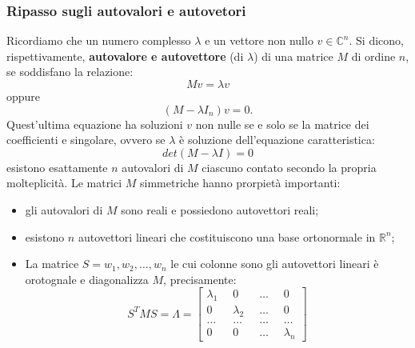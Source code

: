 \subsubsection{Ripasso sugli autovalori e autovetori}
Ricordiamo che un numero complesso $\lambda$ e un vettore non nullo $v \in \mathbb{C}^n$. Si dicono, rispettivamente, \textbf{autovalore e autovettore} (di $\lambda$) di una matrice $M$ di ordine $n$, se soddisfano la relazione:
\[
    Mv = \lambda v
\]
oppure
\[
    (M-\lambda I_n)v = 0.
\]
Quest'ultima equazione ha soluzioni $v$ non nulle se e solo se la matrice dei coefficienti e singolare, ovvero se $\lambda$ è soluzione dell'equazione caratteristica:
\[
    det(M-\lambda I) = 0
\]
esistono esattamente $n$ autovalori di $M$ ciascuno contato secondo la propria molteplicità.\newline
Le matrici $M$ simmetriche hanno prorpietà importanti:
\begin{itemize}
    \item gli autovalori di $M$ sono reali e possiedono autovettori reali;
    \item esistono $n$ autovettori lineari che costituiscono una base ortonormale in $\mathbb{R}^n$;
    \item La matrice $S = {w_1, w_2, \dots, w_n}$ le cui colonne sono gli autovettori lineari è orotognale e diagonalizza $M$, precisamente:
    \[
        S^TMS = \Lambda = \left[\begin{matrix}
            \lambda_1 \;\; &0 \;\; &\dots \;\; &0\\
            0 \;\; &\lambda_2 \;\; &\dots \;\; &0\\
            \dots \;\; &\dots \;\; &\dots \;\; &\dots\\
            0 \;\; &0 \;\; &\dots \;\; &\lambda_n
        \end{matrix}\right]
    \]
\end{itemize}
